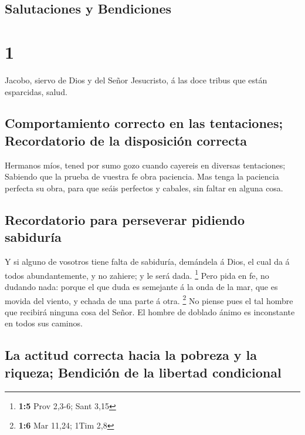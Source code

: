 \hypertarget{salutaciones-y-bendiciones}{%
\subsection{Salutaciones y
Bendiciones}\label{salutaciones-y-bendiciones}}

\hypertarget{section}{%
\section{1}\label{section}}

 Jacobo, siervo de Dios y del Señor Jesucristo, á las doce
tribus que están esparcidas, salud.

\hypertarget{comportamiento-correcto-en-las-tentaciones-recordatorio-de-la-disposiciuxf3n-correcta}{%
\subsection{Comportamiento correcto en las tentaciones; Recordatorio de
la disposición
correcta}\label{comportamiento-correcto-en-las-tentaciones-recordatorio-de-la-disposiciuxf3n-correcta}}

 Hermanos míos, tened por sumo gozo cuando cayereis en
diversas tentaciones;  Sabiendo que la prueba de vuestra
fe obra paciencia.  Mas tenga la paciencia perfecta su
obra, para que seáis perfectos y cabales, sin faltar en alguna cosa.

\hypertarget{recordatorio-para-perseverar-pidiendo-sabiduruxeda}{%
\subsection{Recordatorio para perseverar pidiendo
sabiduría}\label{recordatorio-para-perseverar-pidiendo-sabiduruxeda}}

 Y si alguno de vosotros tiene falta de sabiduría,
demándela á Dios, el cual da á todos abundantemente, y no zahiere; y le
será dada. \footnote{\textbf{1:5} Prov 2,3-6; Sant 3,15} 
Pero pida en fe, no dudando nada: porque el que duda es semejante á la
onda de la mar, que es movida del viento, y echada de una parte á otra.
\footnote{\textbf{1:6} Mar 11,24; 1Tim 2,8}  No piense
pues el tal hombre que recibirá ninguna cosa del Señor. 
El hombre de doblado ánimo es inconstante en todos sus caminos.

\hypertarget{la-actitud-correcta-hacia-la-pobreza-y-la-riqueza-bendiciuxf3n-de-la-libertad-condicional}{%
\subsection{La actitud correcta hacia la pobreza y la riqueza; Bendición
de la libertad
condicional}\label{la-actitud-correcta-hacia-la-pobreza-y-la-riqueza-bendiciuxf3n-de-la-libertad-condicional}}

